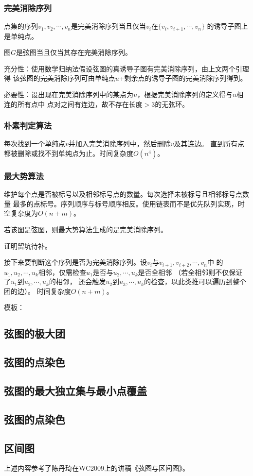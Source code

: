 \subsubsection{完美消除序列}
点集的序列$v_1,v_2,\cdots,v_n$是完美消除序列当且仅当$v_i$在$\{v_i,v_{i+1},\cdots,v_n\}$
的诱导子图上是单纯点。
\begin{theorem}
    图$G$是弦图当且仅当其存在完美消除序列。
\end{theorem}
充分性：使用数学归纳法假设弦图的真诱导子图有完美消除序列，由上文两个引理得
该弦图的完美消除序列可由单纯点$u$+剩余点的诱导子图的完美消除序列得到。

必要性：设出现在完美消除序列中的某点为$u$，根据完美消除序列的定义得与$u$相连的所有点中
点对之间有连边，故不存在长度$>3$的无弦环。
\subsubsection{朴素判定算法}
每次找到一个单纯点$v$并加入完美消除序列中，然后删除$v$及其连边。
直到所有点都被删除或找不到单纯点为止。时间复杂度$O(n^4)$。
\subsubsection{最大势算法}
维护每个点是否被标号以及相邻标号点的数量。每次选择未被标号且相邻标号点数量
最多的点标号。序列顺序与标号顺序相反。使用链表而不是优先队列实现，时空复杂度为$O(n+m)$。

\begin{theorem}
    若该图是弦图，则最大势算法生成的是完美消除序列。
\end{theorem}
证明留坑待补。

接下来要判断这个序列是否为完美消除序列。设$v_i$与${v_{i+1},v_{i+2},\cdots,v_n}$中
的$u_1,u_2,\cdots,u_k$相邻，仅需检查$u_1$是否与$u_2,\cdots,u_k$是否全相邻
（若全相邻则不仅保证了$u_1$到$u_2,\cdots,u_k$的相邻，
还会触发$u_2$到$u_3,\cdots,u_k$的检查，以此类推可以遍历到整个团的边）。
时间复杂度$O(n+m)$。

模板：

\subsection{弦图的极大团}
\subsection{弦图的点染色}
\subsection{弦图的最大独立集与最小点覆盖}
\subsection{弦图的点染色}
\subsection{区间图}
上述内容参考了陈丹琦在WC2009上的讲稿《弦图与区间图》\cite{chord}。
